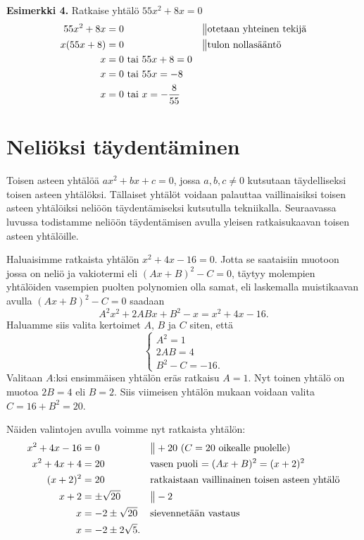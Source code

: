 \textbf{Esimerkki 4.}
Ratkaise yhtälö $55x^2+8x=0$
\begin{align*}
55x^2+8x&=0 \ \ \ \ \ &&\big\|\text{otetaan yhteinen tekijä} \\
x(55x+8)&=0 \ \ \ \ \ &&\big\|\text{tulon nollasääntö} \\
x&=0 \text{ tai } 55x+8=0 \\
x&=0 \text{ tai } 55x=-8 \\
x&=0 \text{ tai } x=-\frac{8}{55}
\end{align*}
\section{Neliöksi täydentäminen}
Toisen asteen yhtälöä $ax^2+bx+c=0$, jossa $a,b,c \neq 0$ kutsutaan
täydelliseksi toisen asteen yhtälöksi. Tällaiset yhtälöt voidaan palauttaa
vaillinaisiksi toisen asteen yhtälöiksi neliöön täydentämiseksi kutsutulla
tekniikalla. Seuraavassa luvussa todistamme neliöön täydentämisen avulla
yleisen ratkaisukaavan toisen asteen yhtälöille.

\begin{esimerkki}
Haluaisimme ratkaista yhtälön $x^2+4x-16 = 0$. Jotta se saataisiin muotoon
jossa on neliö ja vakiotermi eli $(Ax+B)^2-C=0$, täytyy molempien yhtälöiden
vasempien puolten polynomien olla samat, eli laskemalla muistikaavan avulla
$(Ax+B)^2-C=0$ saadaan
\[A^2x^2+2ABx+B^2-x=x^2+4x-16.\]
Haluamme siis valita kertoimet $A$, $B$ ja $C$ siten, että 
\[\left\{\begin{array}{l}
A^2=1 \\ 2AB=4 \\ B^2-C=-16.
\end{array}\right.\]
Valitaan $A$:ksi ensimmäisen yhtälön eräs ratkaisu $A = 1$. Nyt toinen yhtälö
on muotoa $2B=4$ eli $B = 2$. Siis viimeisen yhtälön mukaan voidaan valita
$C = 16+B^2 = 20$.

Näiden valintojen avulla voimme nyt ratkaista yhtälön:
\begin{align*}
x^2+4x-16 &= 0 &&\big\| + 20 \text{ ($C = 20$ oikealle puolelle)} \\
x^2+4x+4 &= 20 &&\text{vasen puoli $ = (Ax+B)^2 = (x+2)^2$} \\
(x+2)^2 &= 20 &&\text{ratkaistaan vaillinainen toisen asteen yhtälö} \\
x+2 &= \pm \sqrt{20} &&\big\| - 2 \\
x &= -2 \pm \sqrt{20} &&\text{sievennetään vastaus} \\
x &= -2 \pm 2\sqrt{5}.
\end{align*}
\end{esimerkki}

